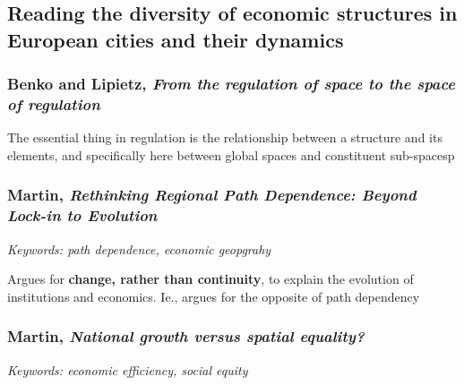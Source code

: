 \documentclass{article}
\begin{document}
\subsection{Reading the diversity of economic structures in European cities and their dynamics}

\subsubsection{Benko and Lipietz, \textit{From the regulation of space to the space of regulation}}

\begin{outline}
	\1 The essential thing in regulation is the relationship between a structure and its elements, and specifically here between global spaces and constituent sub-spacesp
\end{outline}

\subsubsection{Martin, \textit{Rethinking Regional Path Dependence: Beyond Lock-in to Evolution}}

\textit{Keywords: path dependence, economic geopgrahy}

\begin{outline}
	\1 Argues for \textbf{change, rather than continuity}, to explain the evolution of institutions and economics. Ie., argues for the opposite of path dependency
\end{outline}

\subsubsection{Martin, \textit{National growth versus spatial equality?}}

\textit{Keywords: economic efficiency, social equity}
\end{document}
